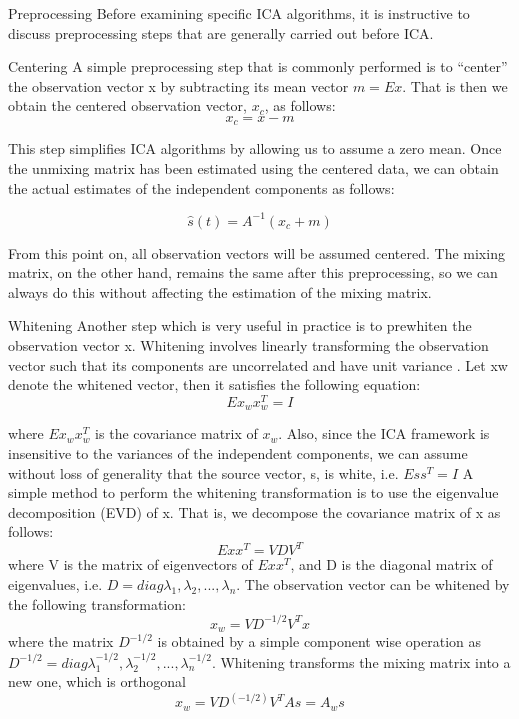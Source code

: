 \begin{compactitem}
\item {Preprocessing}
Before examining specific ICA algorithms, it is instructive
to discuss preprocessing steps that are generally carried out
before ICA.

\item {Centering}
A simple preprocessing step that is commonly performed
is to “center” the observation vector x by subtracting its
mean vector $m=E{x}$. That is then we obtain the centered
observation vector, $x_c$, as follows:
\begin{equation}
\label{eq:ica-zero-mean}
x_c = x-m
\end{equation}

This step simplifies ICA algorithms by allowing us to
assume a zero mean. Once the unmixing matrix has been
estimated using the centered data, we can obtain the actual
estimates of the independent components as follows:

\begin{equation}
\label{eq:ica-source}
\hat{s}(t) = A^{-1} (x_c + m )
\end{equation}

From this point on, all observation vectors will be assumed
centered. The mixing matrix, on the other hand,
remains the same after this preprocessing, so we can always
do this without affecting the estimation of the mixing
matrix.

\item {Whitening}
Another step which is very useful in practice is to prewhiten
the observation vector x. Whitening involves linearly
transforming the observation vector such that its components
are uncorrelated and have unit variance . Let
xw denote the whitened vector, then it satisfies the following
equation:
\begin{equation}
\label{eq:ica-source1}
E{x_w x^T_w} = I
\end{equation}

where $E{x_w x^T_w}$ is the covariance matrix of $x_w$. Also,
since the ICA framework is insensitive to the variances
of the independent components, we can assume without
loss of generality that the source vector, s, is white, i.e.
$E{s s^T } = I$
A simple method to perform the whitening transformation
is to use the eigenvalue decomposition (EVD) of x.
That is, we decompose the covariance matrix of x as follows:
\begin{equation}
\label{eq:ica-evd}
E{x x^T } =VDV^T
\end{equation}
where V is the matrix of eigenvectors of $E{x x^T }$,
and D is the diagonal matrix of eigenvalues, i.e.
$D = diag{\lambda_1,\lambda_2, ...,\lambda_n}$. The observation vector can be
whitened by the following transformation:
\begin{equation}
\label{eq:ica-whiteningX1}
x_w = VD^{-1/2}V^Tx
\end{equation}
where the matrix $D^{-1/2}$ is obtained by a
simple component wise operation as $D^{-1/2}=diag{\lambda_1^{-1/2},\lambda_2^{-1/2},...,\lambda_n^{-1/2}}$. Whitening transforms
the mixing matrix into a new one, which is orthogonal
\begin{equation}
\label{eq:ica-whiteningX}
x_w=VD^(-1/2)V^TAs=A_w s
\end{equation}


\end{compactitem}
